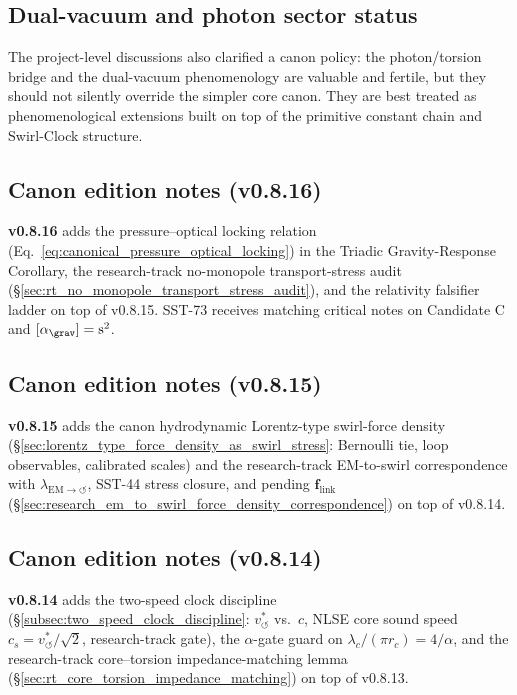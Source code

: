 \documentclass[11pt]{article}
\theoremstyle{definition}
\theoremstyle{plain}
\theoremstyle{remark}
\newcommand{\rc}{{r_c}}
\newcommand{\vchar}{v_{\!\boldsymbol{\circlearrowleft}}^{\ast}}
\begin{document}
        \subsection{Dual-vacuum and photon sector status}
            The project-level discussions also clarified a canon policy: the photon/torsion bridge and the dual-vacuum phenomenology are valuable and fertile, but they should not silently override the simpler core canon. They are best treated as phenomenological extensions built on top of the primitive constant chain and Swirl-Clock structure.

        \subsection{Canon edition notes (v0.8.16)}
            \textbf{v0.8.16} adds the pressure--optical locking relation (Eq.~\ref{eq:canonical_pressure_optical_locking}) in the Triadic Gravity-Response Corollary, the research-track no-monopole transport-stress audit (\S\ref{sec:rt_no_monopole_transport_stress_audit}), and the relativity falsifier ladder on top of v0.8.15. SST-73 receives matching critical notes on Candidate C and $[\alpha_{\grav}]=\mathrm{s^2}$.

        \subsection{Canon edition notes (v0.8.15)}
            \textbf{v0.8.15} adds the canon hydrodynamic Lorentz-type swirl-force density (\S\ref{sec:lorentz_type_force_density_as_swirl_stress}: Bernoulli tie, loop observables, calibrated scales) and the research-track EM-to-swirl correspondence with $\lambda_{\mathrm{EM}\to\circlearrowleft}$, SST-44 stress closure, and pending $\mathbf f_{\mathrm{link}}$ (\S\ref{sec:research_em_to_swirl_force_density_correspondence}) on top of v0.8.14.

        \subsection{Canon edition notes (v0.8.14)}
            \textbf{v0.8.14} adds the two-speed clock discipline (\S\ref{subsec:two_speed_clock_discipline}: $\vchar$ vs.\ $c$, NLSE core sound speed $c_s=\vchar/\sqrt{2}$, research-track gate), the $\alpha$-gate guard on $\lambda_c/(\pi\rc)=4/\alpha$, and the research-track core--torsion impedance-matching lemma (\S\ref{sec:rt_core_torsion_impedance_matching}) on top of v0.8.13.
\end{document}
